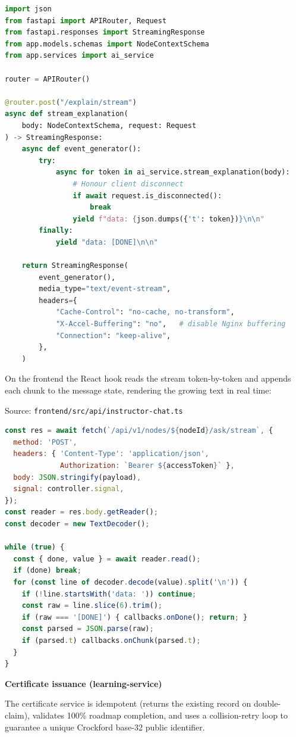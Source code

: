 \begin{lstlisting}[language=Python]
import json
from fastapi import APIRouter, Request
from fastapi.responses import StreamingResponse
from app.models.schemas import NodeContextSchema
from app.services import ai_service

router = APIRouter()

@router.post("/explain/stream")
async def stream_explanation(
    body: NodeContextSchema, request: Request
) -> StreamingResponse:
    async def event_generator():
        try:
            async for token in ai_service.stream_explanation(body):
                # Honour client disconnect
                if await request.is_disconnected():
                    break
                yield f"data: {json.dumps({'t': token})}\n\n"
        finally:
            yield "data: [DONE]\n\n"

    return StreamingResponse(
        event_generator(),
        media_type="text/event-stream",
        headers={
            "Cache-Control": "no-cache, no-transform",
            "X-Accel-Buffering": "no",   # disable Nginx buffering
            "Connection": "keep-alive",
        },
    )
\end{lstlisting}

On the frontend the React hook reads the stream token-by-token and appends each chunk to the message state, rendering the growing text in real time:

Source: \texttt{frontend/src/api/instructor-chat.ts}

\begin{lstlisting}[language=JavaScript]
const res = await fetch(`/api/v1/nodes/${nodeId}/ask/stream`, {
  method: 'POST',
  headers: { 'Content-Type': 'application/json',
             Authorization: `Bearer ${accessToken}` },
  body: JSON.stringify(payload),
  signal: controller.signal,
});
const reader = res.body.getReader();
const decoder = new TextDecoder();

while (true) {
  const { done, value } = await reader.read();
  if (done) break;
  for (const line of decoder.decode(value).split('\n')) {
    if (!line.startsWith('data: ')) continue;
    const raw = line.slice(6).trim();
    if (raw === '[DONE]') { callbacks.onDone(); return; }
    const parsed = JSON.parse(raw);
    if (parsed.t) callbacks.onChunk(parsed.t);
  }
}
\end{lstlisting}

\textbf{Certificate issuance (learning-service)}

The certificate service is idempotent (returns the existing record on double-claim), validates 100\% roadmap completion, and uses a collision-retry loop to guarantee a unique Crockford base-32 public identifier.

